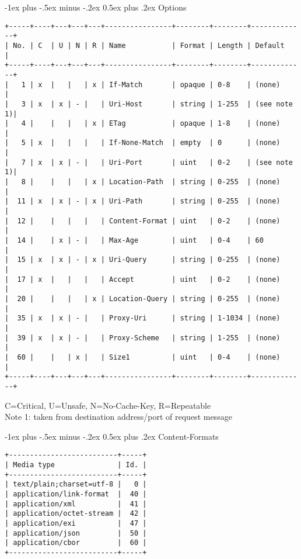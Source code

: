 \documentclass[a4,10pt,landscape]{article}
\makeatletter
\renewcommand{\section}{\@startsection{section}{1}{0mm}%
                                {-1ex plus -.5ex minus -.2ex}%
                                {0.5ex plus .2ex}%
                                {\normalfont\large\bfseries}}
\makeatother
\begin{document}
\begin{multicols}{3}
\section{Options}
{\tiny
\begin{verbatim}
+-----+----+---+---+---+----------------+--------+--------+-------------+
| No. | C  | U | N | R | Name           | Format | Length | Default     |
+-----+----+---+---+---+----------------+--------+--------+-------------+
|   1 | x  |   |   | x | If-Match       | opaque | 0-8    | (none)      |
|   3 | x  | x | - |   | Uri-Host       | string | 1-255  | (see note 1)|
|   4 |    |   |   | x | ETag           | opaque | 1-8    | (none)      |
|   5 | x  |   |   |   | If-None-Match  | empty  | 0      | (none)      |
|   7 | x  | x | - |   | Uri-Port       | uint   | 0-2    | (see note 1)|
|   8 |    |   |   | x | Location-Path  | string | 0-255  | (none)      |
|  11 | x  | x | - | x | Uri-Path       | string | 0-255  | (none)      |
|  12 |    |   |   |   | Content-Format | uint   | 0-2    | (none)      |
|  14 |    | x | - |   | Max-Age        | uint   | 0-4    | 60          |
|  15 | x  | x | - | x | Uri-Query      | string | 0-255  | (none)      |
|  17 | x  |   |   |   | Accept         | uint   | 0-2    | (none)      |
|  20 |    |   |   | x | Location-Query | string | 0-255  | (none)      |
|  35 | x  | x | - |   | Proxy-Uri      | string | 1-1034 | (none)      |
|  39 | x  | x | - |   | Proxy-Scheme   | string | 1-255  | (none)      |
|  60 |    |   | x |   | Size1          | uint   | 0-4    | (none)      |
+-----+----+---+---+---+----------------+--------+--------+-------------+
\end{verbatim}
C=Critical, U=Unsafe, N=No-Cache-Key, R=Repeatable \\
Note 1: taken from destination address/port of request message
}

\section{Content-Formats}
{\tiny
\begin{verbatim}
+--------------------------+-----+
| Media type               | Id. |
+--------------------------+-----+
| text/plain;charset=utf-8 |   0 |
| application/link-format  |  40 |
| application/xml          |  41 |
| application/octet-stream |  42 |
| application/exi          |  47 |
| application/json         |  50 |
| application/cbor         |  60 |
+--------------------------+-----+
\end{verbatim}
}


\end{multicols}
\end{document}
